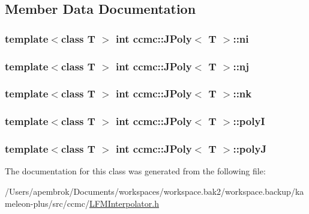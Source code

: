 \subsection{Member Data Documentation}
\hypertarget{classccmc_1_1_j_poly_a0bb48597758d01c4e439500780d101a7}{
\subsubsection[{ni}]{\setlength{\rightskip}{0pt plus 5cm}template$<$class T $>$ int {\bf ccmc\-::\-J\-Poly}$<$ T $>$\-::ni}}\label{classccmc_1_1_j_poly_a0bb48597758d01c4e439500780d101a7}
\hypertarget{classccmc_1_1_j_poly_aa7a29fd9cf2e058faa58309ae35fce5c}{
\subsubsection[{nj}]{\setlength{\rightskip}{0pt plus 5cm}template$<$class T $>$ int {\bf ccmc\-::\-J\-Poly}$<$ T $>$\-::nj}}\label{classccmc_1_1_j_poly_aa7a29fd9cf2e058faa58309ae35fce5c}
\hypertarget{classccmc_1_1_j_poly_a6870b304bbe9257d99d0a7aa02b11f37}{
\subsubsection[{nk}]{\setlength{\rightskip}{0pt plus 5cm}template$<$class T $>$ int {\bf ccmc\-::\-J\-Poly}$<$ T $>$\-::nk}}\label{classccmc_1_1_j_poly_a6870b304bbe9257d99d0a7aa02b11f37}
\hypertarget{classccmc_1_1_j_poly_a6a1be93e848453b2f5708cfe58fc9734}{
\subsubsection[{poly\-I}]{\setlength{\rightskip}{0pt plus 5cm}template$<$class T $>$ int {\bf ccmc\-::\-J\-Poly}$<$ T $>$\-::poly\-I}}\label{classccmc_1_1_j_poly_a6a1be93e848453b2f5708cfe58fc9734}
\hypertarget{classccmc_1_1_j_poly_ab127c7226a977fb88668fa22f4acfd93}{
\subsubsection[{poly\-J}]{\setlength{\rightskip}{0pt plus 5cm}template$<$class T $>$ int {\bf ccmc\-::\-J\-Poly}$<$ T $>$\-::poly\-J}}\label{classccmc_1_1_j_poly_ab127c7226a977fb88668fa22f4acfd93}


The documentation for this class was generated from the following file\-:\begin{DoxyCompactItemize}
\item 
/\-Users/apembrok/\-Documents/workspaces/workspace.\-bak2/workspace.\-backup/kameleon-\/plus/src/ccmc/\hyperlink{_l_f_m_interpolator_8h}{L\-F\-M\-Interpolator.\-h}\end{DoxyCompactItemize}

